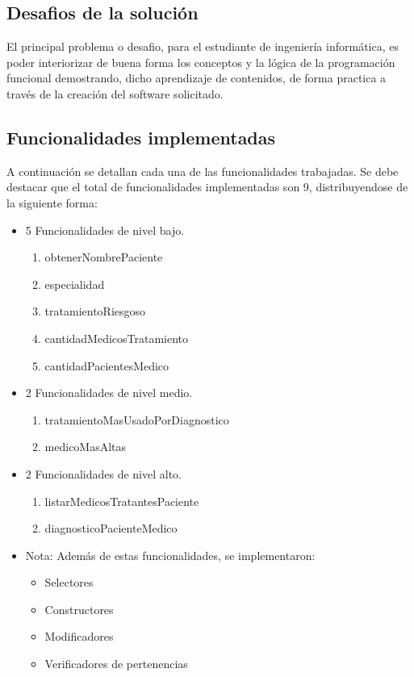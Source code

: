 \documentclass[12pt,letterpaper]{article}
\begin{document}
	\subsection{Desafios de la solución}
	El principal problema o desafio, para el estudiante de ingeniería informática, es poder interiorizar de buena forma los conceptos y la lógica de la programación funcional demostrando, dicho aprendizaje de contenidos, de forma practica a través de la creación del software solicitado.
	
	\subsection{Funcionalidades implementadas}
	A continuación se detallan cada una de las funcionalidades trabajadas. Se debe destacar que el total de funcionalidades implementadas son 9, distribuyendose de la siguiente forma:
	\begin{itemize}
	\item 5 Funcionalidades de nivel bajo.
	\begin{enumerate}
	\item obtenerNombrePaciente
	\item especialidad
	\item tratamientoRiesgoso
	\item cantidadMedicosTratamiento
	\item cantidadPacientesMedico
	\end{enumerate}
	\item 2 Funcionalidades de nivel medio.
	\begin{enumerate}
	\item tratamientoMasUsadoPorDiagnostico
	\item medicoMasAltas
	\end{enumerate}
	\item 2 Funcionalidades de nivel alto.
	\begin{enumerate}
	\item listarMedicosTratantesPaciente
	\item diagnosticoPacienteMedico
	\end{enumerate}
	\item Nota: Además de estas funcionalidades, se implementaron: 
	\begin{itemize}
	\item Selectores
	\item Constructores
	\item Modificadores
	\item Verificadores de pertenencias
	\end{itemize}
	\end{itemize}
\end{document}
